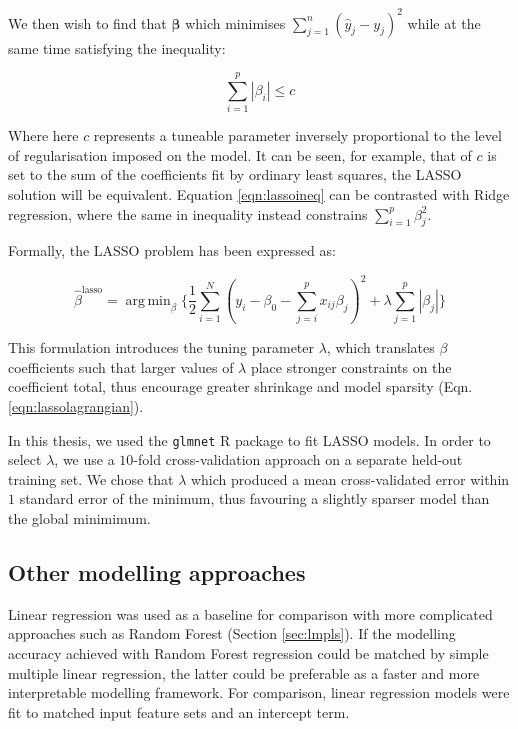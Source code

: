 \documentclass[a4paper,11pt,oneside]{book}
\DeclareMathOperator*{\argmin}{arg\,min}
\begin{document}
We then wish to find that $\bm{\beta}$ which minimises $\sum_{j=1}^{n}(\hat{y}_j - y_j)^2$ while at the same time satisfying the inequality:

\begin{equation}\label{eqn:lassoineq}
\sum\limits_{i=1}^{p} |\beta_i| \leq c
\end{equation} \vspace{.2em}

Where here $c$ represents a tuneable parameter inversely proportional to the level of regularisation imposed on the model. It can be seen, for example, that of $c$ is set to the sum of the coefficients fit by ordinary least squares, the LASSO solution will be equivalent. Equation \ref{eqn:lassoineq} can be contrasted with Ridge regression, where the same in inequality instead constrains $\sum_{i=1}^{p} \beta_j^2$.

Formally, the LASSO problem has been expressed as:\cite{Hastie2001}

\begin{equation}\label{eqn:lassolagrangian}
\hat{\beta}^\mathrm{lasso} = \argmin_\beta \bigg\{ 
\frac{1}{2} \sum_{i=1}^N (y_i - \beta_0 - \sum_{j=i}^p x_{ij}\beta_j)^2 
+ \lambda \sum_{j=1}^p |\beta_j|
\bigg\}
\end{equation} \vspace{.2em}

This formulation introduces the tuning parameter $\lambda$, which translates $\beta$ coefficients such that larger values of $\lambda$ place stronger constraints on the coefficient total, thus encourage greater shrinkage and model sparsity (Eqn. \ref{eqn:lassolagrangian}).

In this thesis, we used the \texttt{glmnet} R package to fit LASSO models.\cite{glmnet1, glmnet2} In order to select $\lambda$, we use a $10$-fold cross-validation approach on a separate held-out training set. We chose that $\lambda$ which produced a mean cross-validated error within $1$ standard error of the minimum, thus favouring a slightly sparser model than the global minimimum.

\subsection{Other modelling approaches}\label{meth:othermodels}
 
Linear regression was used as a baseline for comparison with more complicated approaches such as Random Forest (Section \ref{sec:lmpls}). If the  modelling accuracy achieved with Random Forest regression could be matched by simple multiple linear regression, the latter could be preferable as a faster and more interpretable modelling framework. For comparison, linear regression models were fit to matched input feature sets and an intercept term.
\end{document}

